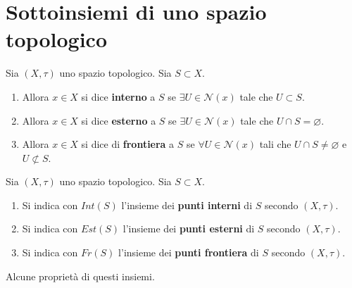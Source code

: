 \section{Sottoinsiemi di uno spazio topologico}

\begin{definition}
	Sia $(X, \tau)$ uno spazio topologico. Sia $S \subset X$. 
	\begin{enumerate}
		\item Allora $x \in X$ si dice \textbf{interno} a $S$ se $\exists U \in \mathcal{N}(x)$ tale che $U \subset S$.
		\item Allora $x \in X$ si dice \textbf{esterno} a $S$ se $\exists U \in \mathcal{N}(x)$ tale che $U \cap S = \varnothing$.
		\item Allora $x \in X$ si dice di \textbf{frontiera} a $S$ se $\forall U \in \mathcal{N}(x)$ tali che $U \cap S \neq \varnothing$ e $U \not\subset S$.
	\end{enumerate}
\end{definition}

\begin{definition}
	Sia $(X, \tau)$ uno spazio topologico. Sia $S \subset X$. 
	\begin{enumerate}
		\item Si indica con $Int(S)$ l'insieme dei \textbf{punti interni} di $S$ secondo $(X,\tau)$.
		\item Si indica con $Est(S)$ l'insieme dei \textbf{punti esterni} di $S$ secondo $(X,\tau)$.
		\item Si indica con $Fr(S)$ l'insieme dei \textbf{punti frontiera} di $S$ secondo $(X,\tau)$.
	\end{enumerate}
\end{definition}	

Alcune proprietà di questi insiemi.

